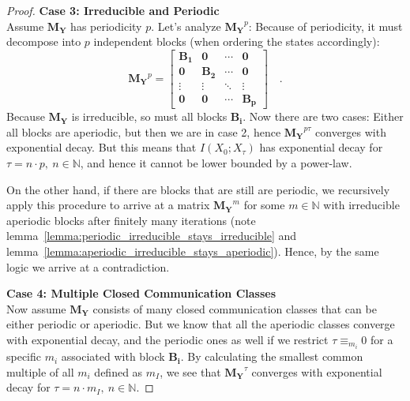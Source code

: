 \documentclass[../../main.tex]{subfiles}
\begin{document}
\begin{proof}
        \textbf{Case 3: Irreducible and Periodic} \\
        Assume $\bm{M_Y}$ has periodicity $p$. Let's analyze $\bm{M_Y}^p$: Because of periodicity, it must decompose into $p$ independent blocks (when ordering the states accordingly):
        \[
            \bm{M_Y}^p = 
            \begin{bmatrix}
            \bm{B_1} & \bm{0} & \cdots & \bm{0} \\
            \bm{0} & \bm{B_2} & \cdots & \bm{0} \\
            \vdots & \vdots & \ddots & \vdots \\
            \bm{0} & \bm{0} & \cdots & \bm{B_p}
            \end{bmatrix}
            \quad .
        \]
        Because $\bm{M_Y}$ is irreducible, so must all blocks $\bm{B_i}$. Now there are two cases: Either all blocks are aperiodic, but then we are in case 2, hence $\bm{M_Y}^{p \tau}$ converges with exponential decay. But this means that $I(X_0; X_\tau)$ has exponential decay for $\tau = n \cdot p, \ n \in \mathbb{N}$, and hence it cannot be lower bounded by a power-law.

        On the other hand, if there are blocks that are still are periodic, we recursively apply this procedure to arrive at a matrix $\bm{M_Y}^m$ for some $m \in \mathbb{N}$ with irreducible aperiodic blocks after finitely many iterations (note lemma~\ref{lemma:periodic_irreducible_stays_irreducible} and lemma~\ref{lemma:aperiodic_irreducible_stays_aperiodic}). Hence, by the same logic we arrive at a contradiction.

        \textbf{Case 4: Multiple Closed Communication Classes} \\
        Now assume $\bm{M_Y}$ consists of many closed communication classes that can be either periodic or aperiodic. But we know that all the aperiodic classes converge with exponential decay, and the periodic ones as well if we restrict $\tau \equiv_{m_i} 0$ for a specific $m_i$ associated with block $\bm{B_i}$. By calculating the smallest common multiple of all $m_i$ defined as $m_I$, we see that $\bm{M_Y}^\tau$ converges with exponential decay for $\tau = n \cdot m_I, \ n \in \mathbb{N}$.


\end{proof}
\end{document}
